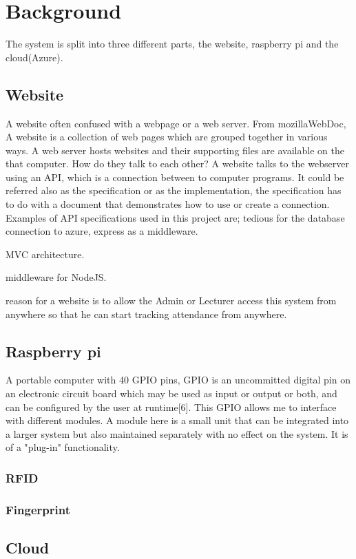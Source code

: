 \chapter{Background}
The system is split into three different parts, the website, raspberry pi and the cloud(Azure).



\section{Website}
A website often confused with a webpage or a web server. From mozillaWebDoc, A website is a collection of web pages which are grouped together in various ways. A web server hosts websites and their supporting files are available on the that computer. 
How do they talk to each other?
A website talks to the webserver using an API, which is a connection between to computer programs. It could be referred also as the specification or as the implementation, the specification has to do with a document that demonstrates how to use or create a connection. Examples of API specifications used in this project are; tedious for the database connection to azure, express as a middleware. 

MVC architecture.

middleware for NodeJS.

reason for a website is to allow the Admin or Lecturer access this system from anywhere so that he can start tracking attendance from anywhere.

\section{Raspberry pi}
A portable computer with 40 GPIO pins, 
GPIO is an uncommitted digital pin on an electronic circuit board which may be used as input or output or both, and can be configured by the user at runtime[6]. This GPIO allows me to interface with different modules. A module here is a small unit that can be integrated into a larger system but also maintained separately with no effect on the system. It is of a "plug-in" functionality.


\subsection{RFID}




\subsection{Fingerprint}



\section{Cloud}




